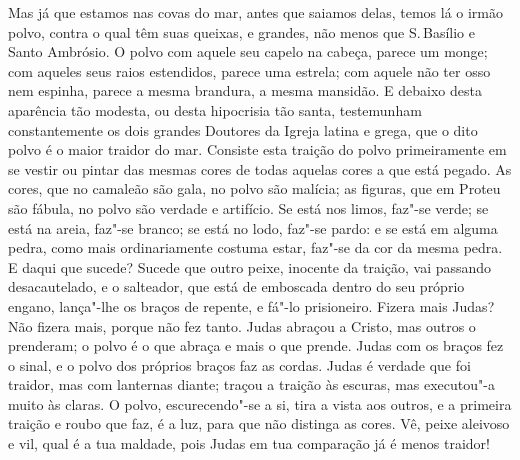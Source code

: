 Mas já que estamos nas covas do mar, antes que saiamos delas, temos lá o
irmão polvo, contra o qual têm suas queixas, e grandes, não menos que S.\,Basílio e Santo Ambrósio. O polvo com aquele seu capelo na cabeça,
parece um monge; com aqueles seus raios estendidos, parece uma estrela;
com aquele não ter osso nem espinha, parece a mesma brandura, a mesma
mansidão. E debaixo desta aparência tão modesta, ou desta hipocrisia tão
santa, testemunham constantemente os dois grandes Doutores da Igreja
latina e grega, que o dito polvo é o maior traidor do mar. Consiste esta
traição do polvo primeiramente em se vestir ou pintar das mesmas cores
de todas aquelas cores a que está pegado. As cores, que no camaleão são
gala, no polvo são malícia; as figuras, que em Proteu são fábula, no
polvo são verdade e artifício. Se está nos limos, faz"-se verde; se está
na areia, faz"-se branco; se está no lodo, faz"-se pardo: e se está em
alguma pedra, como mais ordinariamente costuma estar, faz"-se da cor da
mesma pedra. E daqui que sucede? Sucede que outro peixe, inocente da
traição, vai passando desacautelado, e o salteador, que está de
emboscada dentro do seu próprio engano, lança"-lhe os braços de repente,
e fá"-lo prisioneiro. Fizera mais Judas? Não fizera mais, porque não fez
tanto. Judas abraçou a Cristo, mas outros o prenderam; o polvo é o que
abraça e mais o que prende. Judas com os braços fez o sinal, e o polvo
dos próprios braços faz as cordas. Judas é verdade que foi traidor, mas
com lanternas diante; traçou a traição às escuras, mas executou"-a muito
às claras. O polvo, escurecendo"-se a si, tira a vista aos outros, e a
primeira traição e roubo que faz, é a luz, para que não distinga as
cores. Vê, peixe aleivoso e vil, qual é a tua maldade, pois Judas em tua
comparação já é menos traidor!

